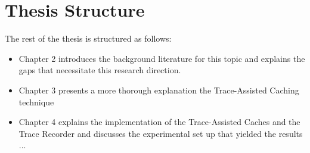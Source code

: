 \section{Thesis Structure}

The rest of the thesis is structured as follows:
\begin{itemize}
	\item Chapter 2 introduces the background literature for this topic and explains the gaps that necessitate this research direction.
	\item Chapter 3 presents a more thorough explanation the Trace-Assisted Caching technique 
	\item Chapter 4 explains the implementation of the Trace-Assisted Caches and the Trace Recorder and discusses the experimental set up that yielded the results
	...
\end{itemize}
